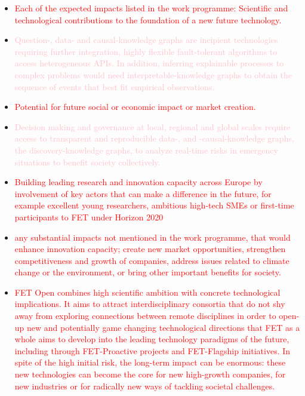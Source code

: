 \documentclass[11pt, a4paper]{article} %
\begin{document}
\begin{itemize}
\item \textcolor{red}{Each of the expected impacts listed in the work
    programme: Scientific and technological contributions to the
    foundation of a new future technology.}
\item \textcolor{pink}{Question-, data- and causal-knowledge graphs
    are incipient technologies requiring further integration, highly
    flexible fault-tolerant algorithms to access heterogeneous
    APIs. In addition, inferring explainable processes to complex
    problems would need interpretable-knowledge graphs to obtain the
    sequence of events that best fit empirical observations.}
\item \textcolor{red}{Potential for future social or economic impact
    or market creation.}
\item \textcolor{pink}{Decision making and governance at local,
    regional and global scales require access to transparent and
    reproducible data-, and -causal-knowledge graphs, the
    discovery-knowledge graphs, to analyze real-time risks in
    emergency situations to benefit society collectively.}
  \item \textcolor{red}{Building leading research and innovation
      capacity across Europe by involvement of key actors that can
      make a difference in the future, for example excellent young
      researchers, ambitious high-tech SMEs or first-time participants
      to FET under Horizon 2020}
  \item \textcolor{red}{any substantial impacts not mentioned in the
      work programme, that would enhance innovation capacity; create
      new market opportunities, strengthen competitiveness and growth
      of companies, address issues related to climate change or the
      environment, or bring other important benefits for society.}
  \item \textcolor{red}{FET Open combines high scientific ambition
      with concrete technological implications. It aims to attract
      interdisciplinary consortia that do not shy away from exploring
      connections between remote disciplines in order to open-up new
      and potentially game changing technological directions that FET
      as a whole aims to develop into the leading technology paradigms
      of the future, including through FET-Proactive projects and
      FET-Flagship initiatives. In spite of the high initial risk, the
      long-term impact can be enormous: these new technologies can
      become the core for new high-growth companies, for new
      industries or for radically new ways of tackling societal
      challenges.}
\end{itemize}
\end{document}
